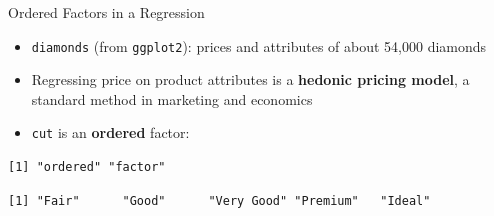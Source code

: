 \documentclass[
  ignorenonframetext,
  aspectratio=169,
]{beamer}
\newenvironment{Shaded}{\begin{snugshade}}{\end{snugshade}}
\newcommand{\FunctionTok}[1]{\textcolor[rgb]{0.28,0.35,0.67}{#1}}
\newcommand{\NormalTok}[1]{\textcolor[rgb]{0.00,0.23,0.31}{#1}}
\newcommand{\SpecialCharTok}[1]{\textcolor[rgb]{0.37,0.37,0.37}{#1}}
\providecommand{\tightlist}{%
  \setlength{\itemsep}{0pt}\setlength{\parskip}{0pt}}\usepackage{longtable,booktabs,array}
\begin{document}
\begin{frame}[fragile]{Ordered Factors in a Regression}
\protect\hypertarget{sec-ordered}{}
\begin{itemize}
\tightlist
\item
  \texttt{diamonds} (from \texttt{ggplot2}): prices and attributes of
  about 54,000 diamonds
\item
  Regressing price on product attributes is a \textbf{hedonic pricing
  model}, a standard method in marketing and economics
\item
  \texttt{cut} is an \textbf{ordered} factor:
\end{itemize}

\begin{Shaded}
\end{Shaded}

\begingroup\tiny\color{darkgray}

\begin{verbatim}
[1] "ordered" "factor" 
\end{verbatim}

\endgroup

\begin{Shaded}
\end{Shaded}

\begingroup\tiny\color{darkgray}

\begin{verbatim}
[1] "Fair"      "Good"      "Very Good" "Premium"   "Ideal"    
\end{verbatim}

\endgroup
\end{frame}
\end{document}

